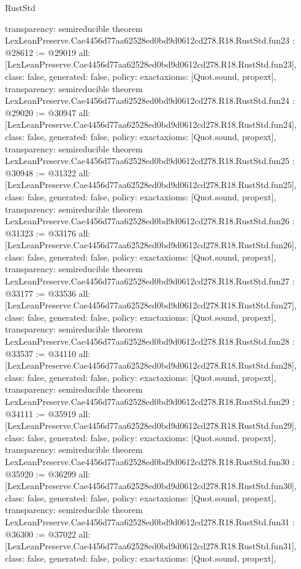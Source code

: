 \begin{lexlean}{RustStd}
\begin{coremodule}
{  transparency: semireducible
}
theorem LexLeanPreserve.Cae4456d77aa62528ed0bd9d0612cd278.R18.RustStd.fun23 : @28612 := @29019 {
  all: [LexLeanPreserve.Cae4456d77aa62528ed0bd9d0612cd278.R18.RustStd.fun23],
  class: false,
  generated: false,
  policy: exact{axioms: [Quot.sound, propext]},
  transparency: semireducible
}
theorem LexLeanPreserve.Cae4456d77aa62528ed0bd9d0612cd278.R18.RustStd.fun24 : @29020 := @30947 {
  all: [LexLeanPreserve.Cae4456d77aa62528ed0bd9d0612cd278.R18.RustStd.fun24],
  class: false,
  generated: false,
  policy: exact{axioms: [Quot.sound, propext]},
  transparency: semireducible
}
theorem LexLeanPreserve.Cae4456d77aa62528ed0bd9d0612cd278.R18.RustStd.fun25 : @30948 := @31322 {
  all: [LexLeanPreserve.Cae4456d77aa62528ed0bd9d0612cd278.R18.RustStd.fun25],
  class: false,
  generated: false,
  policy: exact{axioms: [Quot.sound, propext]},
  transparency: semireducible
}
theorem LexLeanPreserve.Cae4456d77aa62528ed0bd9d0612cd278.R18.RustStd.fun26 : @31323 := @33176 {
  all: [LexLeanPreserve.Cae4456d77aa62528ed0bd9d0612cd278.R18.RustStd.fun26],
  class: false,
  generated: false,
  policy: exact{axioms: [Quot.sound, propext]},
  transparency: semireducible
}
theorem LexLeanPreserve.Cae4456d77aa62528ed0bd9d0612cd278.R18.RustStd.fun27 : @33177 := @33536 {
  all: [LexLeanPreserve.Cae4456d77aa62528ed0bd9d0612cd278.R18.RustStd.fun27],
  class: false,
  generated: false,
  policy: exact{axioms: [Quot.sound, propext]},
  transparency: semireducible
}
theorem LexLeanPreserve.Cae4456d77aa62528ed0bd9d0612cd278.R18.RustStd.fun28 : @33537 := @34110 {
  all: [LexLeanPreserve.Cae4456d77aa62528ed0bd9d0612cd278.R18.RustStd.fun28],
  class: false,
  generated: false,
  policy: exact{axioms: [Quot.sound, propext]},
  transparency: semireducible
}
theorem LexLeanPreserve.Cae4456d77aa62528ed0bd9d0612cd278.R18.RustStd.fun29 : @34111 := @35919 {
  all: [LexLeanPreserve.Cae4456d77aa62528ed0bd9d0612cd278.R18.RustStd.fun29],
  class: false,
  generated: false,
  policy: exact{axioms: [Quot.sound, propext]},
  transparency: semireducible
}
theorem LexLeanPreserve.Cae4456d77aa62528ed0bd9d0612cd278.R18.RustStd.fun30 : @35920 := @36299 {
  all: [LexLeanPreserve.Cae4456d77aa62528ed0bd9d0612cd278.R18.RustStd.fun30],
  class: false,
  generated: false,
  policy: exact{axioms: [Quot.sound, propext]},
  transparency: semireducible
}
theorem LexLeanPreserve.Cae4456d77aa62528ed0bd9d0612cd278.R18.RustStd.fun31 : @36300 := @37022 {
  all: [LexLeanPreserve.Cae4456d77aa62528ed0bd9d0612cd278.R18.RustStd.fun31],
  class: false,
  generated: false,
  policy: exact{axioms: [Quot.sound, propext]},
}
\end{coremodule}
\end{lexlean}
